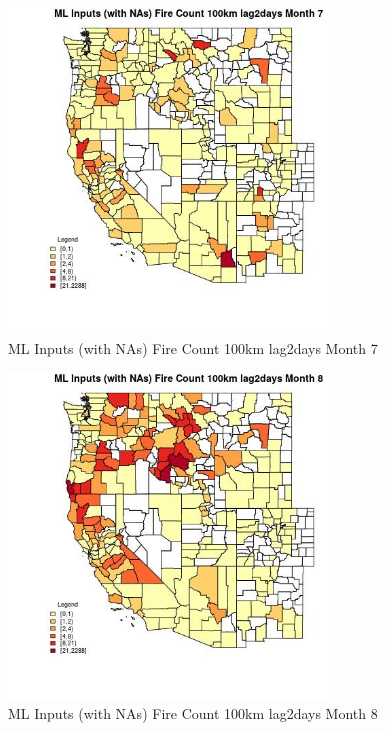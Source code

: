 \begin{figure} 
\centering  
\includegraphics[width=0.77\textwidth]{Code_Outputs/Report_ML_input_PM25_Step4_part_e_de_duplicated_aves_compiled_2019-05-21wNAs_CountyFire_Count_100km_lag2daysmedianMonth7.jpg} 
\caption{\label{fig:Report_ML_input_PM25_Step4_part_e_de_duplicated_aves_compiled_2019-05-21wNAsCountyFire_Count_100km_lag2daysmedianMonth7}ML Inputs (with NAs) Fire Count 100km lag2days Month 7} 
\end{figure} 
 

\begin{figure} 
\centering  
\includegraphics[width=0.77\textwidth]{Code_Outputs/Report_ML_input_PM25_Step4_part_e_de_duplicated_aves_compiled_2019-05-21wNAs_CountyFire_Count_100km_lag2daysmedianMonth8.jpg} 
\caption{\label{fig:Report_ML_input_PM25_Step4_part_e_de_duplicated_aves_compiled_2019-05-21wNAsCountyFire_Count_100km_lag2daysmedianMonth8}ML Inputs (with NAs) Fire Count 100km lag2days Month 8} 
\end{figure} 
 

